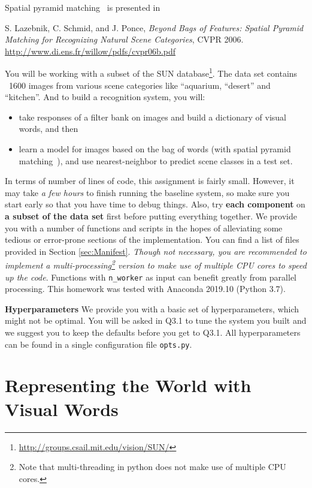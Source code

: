 \documentclass[10pt]{article}
\begin{document}
Spatial pyramid matching~\cite{1641019} is presented in
\begin{center}\parbox{5in}{
S. Lazebnik, C. Schmid, and J. Ponce, {\it Beyond Bags of Features: Spatial Pyramid Matching for Recognizing Natural Scene Categories}, CVPR 2006. \url{http://www.di.ens.fr/willow/pdfs/cvpr06b.pdf}
}
\end{center}
You will be working with a subset of the SUN database\footnote{\url{http://groups.csail.mit.edu/vision/SUN/}}. The data set contains ~1600 images from various scene categories like ``aquarium, ``desert'' and ``kitchen''. And to build a recognition system, you will:
\begin{itemize}
	\item take responses of a filter bank on images and build a dictionary of visual words, and then  
	\item learn a model for images based on the bag of words (with spatial pyramid matching~\cite{1641019}), and use nearest-neighbor to predict scene classes in a test set.
\end{itemize}

In terms of number of lines of code, this assignment is fairly small. However, it may take {\it a few hours} to finish running the baseline system, so make sure you start early so that you have time to debug things. Also, try {\bf each component} on {\bf a subset of the data set} first before putting everything together. We provide you with a number of functions and scripts in the hopes of alleviating some tedious or error-prone sections of the implementation. You can find a list of files provided in Section \ref{sec:Manifest}. {\em Though not necessary, you are recommended to implement a multi-processing\footnote{Note that multi-threading in python does not make use of multiple CPU cores.} version to make use of multiple CPU cores to speed up the code}. Functions with {\tt n\_worker} as input can benefit greatly from parallel processing. This homework was tested with Anaconda 2019.10 (Python 3.7).

{\bf Hyperparameters} We provide you with a basic set of hyperparameters, which might not be optimal. You will be asked in Q3.1 to tune the system you built and we suggest you to keep the defaults before you get to Q3.1. All hyperparameters can be found in a single configuration file {\tt opts.py}.



\section{Representing the World with Visual Words}
\label{sec:visual_words}
\end{document}
